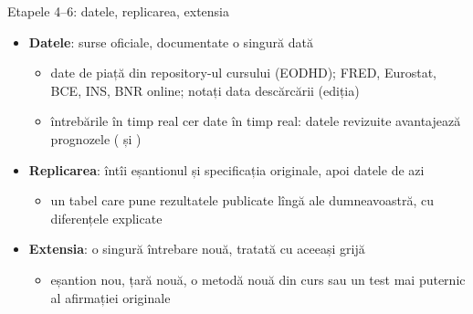 \begin{frame}{Etapele 4--6: datele, replicarea, extensia}
\itemsize{\small}
\begin{itemize}
    \item \textbf{Datele}: surse oficiale, documentate o singură dată
    \begin{itemize}
        \item date de piață din repository-ul cursului (EODHD); FRED, Eurostat, BCE, INS, BNR online; notați data descărcării (ediția)
        \item întrebările în timp real cer date în timp real: datele revizuite avantajează prognozele ( și )
    \end{itemize}
    \item \textbf{Replicarea}: întîi eșantionul și specificația originale, apoi datele de azi
    \begin{itemize}
        \item un tabel care pune rezultatele publicate lîngă ale dumneavoastră, cu diferențele explicate
    \end{itemize}
    \item \textbf{Extensia}: o singură întrebare nouă, tratată cu aceeași grijă
    \begin{itemize}
        \item eșantion nou, țară nouă, o metodă nouă din curs sau un test mai puternic al afirmației originale
    \end{itemize}
\end{itemize}
\end{frame}

